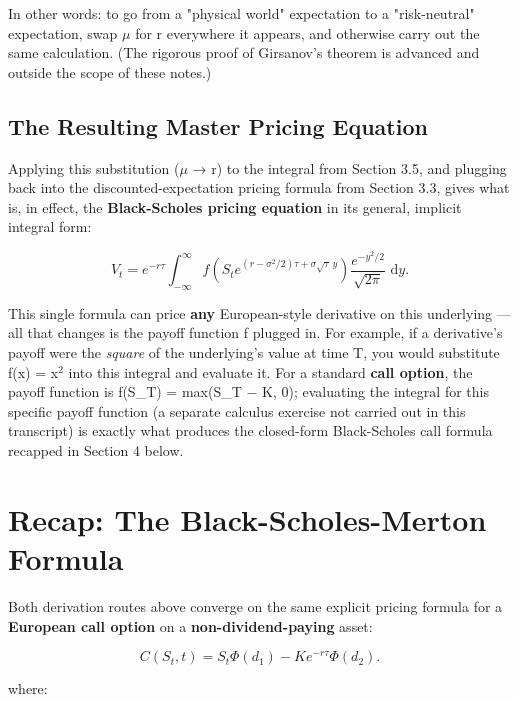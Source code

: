 \documentclass[12pt,openany]{book}
\theoremstyle{definition}
\theoremstyle{remark}
\newcommand{\dd}{\,\mathrm{d}}
\begin{document}
In other words: to go from a "physical world" expectation to a "risk-neutral" expectation, swap \(\mu\) for r everywhere it appears, and otherwise carry out the same calculation. (The rigorous proof of Girsanov's theorem is advanced and outside the scope of these notes.)

\subsection{The Resulting Master Pricing Equation}

Applying this substitution (\(\mu\) → r) to the integral from Section 3.5, and plugging back into the discounted-expectation pricing formula from Section 3.3, gives what is, in effect, the \textbf{Black-Scholes pricing equation} in its general, implicit integral form:

\[
\boxed{
V_t=e^{-r\tau}\int_{-\infty}^{\infty}
f\!\left(S_t e^{(r-\sigma^2/2)\tau+\sigma\sqrt{\tau}\,y}\right)
\frac{e^{-y^2/2}}{\sqrt{2\pi}}\,\dd y.}
\]

This single formula can price \textbf{any} European-style derivative on this underlying --- all that changes is the payoff function f plugged in. For example, if a derivative's payoff were the \emph{square} of the underlying's value at time T, you would substitute f(x) = x\(^2\) into this integral and evaluate it. For a standard \textbf{call option}, the payoff function is f(S\_T) = max(S\_T \(-\) K, 0); evaluating the integral for this specific payoff function (a separate calculus exercise not carried out in this transcript) is exactly what produces the closed-form Black-Scholes call formula recapped in Section 4 below.

\section{Recap: The Black-Scholes-Merton Formula}

Both derivation routes above converge on the same explicit pricing formula for a \textbf{European call option} on a \textbf{non-dividend-paying} asset:

\[\boxed{C(S_t,t)=S_t\Phi(d_1)-Ke^{-r\tau}\Phi(d_2).}\]

where:
\end{document}
